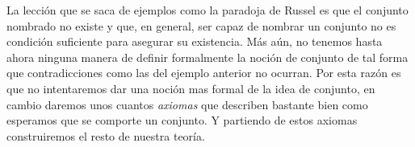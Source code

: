 La lección que se saca de ejemplos como la paradoja de
Russel es que el conjunto nombrado no existe y que, en
general, ser capaz de nombrar un conjunto no es
condición suficiente para asegurar su existencia. Más
aún, no tenemos hasta ahora ninguna manera de definir
formalmente la noción de conjunto de tal forma que
contradicciones como las del ejemplo anterior no
ocurran. Por esta razón es que no intentaremos dar una
noción mas formal de la idea de conjunto, en cambio
daremos unos cuantos \emph{axiomas} que describen
bastante bien como esperamos que se comporte un
conjunto. Y partiendo de estos axiomas construiremos el
resto de nuestra teoría.

